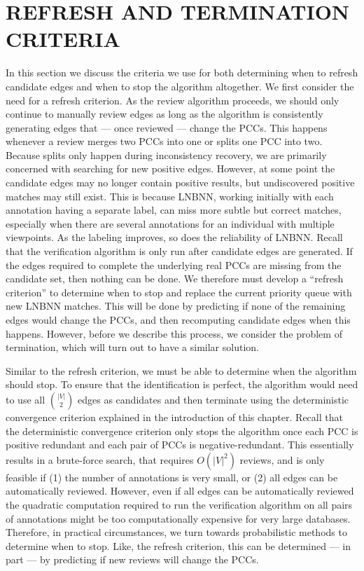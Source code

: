 \section{REFRESH AND TERMINATION CRITERIA}\label{sec:converge}


In this section we discuss the criteria we use for both determining when to refresh candidate edges and when to
  stop the algorithm altogether.
We first consider the need for a refresh criterion.
As the review algorithm proceeds, we should only continue to manually review edges as long as the algorithm is
  consistently generating edges that --- once reviewed --- change the PCCs.
This happens whenever a review merges two PCCs into one or splits one PCC into two.
Because splits only happen during inconsistency recovery, we are primarily concerned with searching for new
  positive edges.
However, at some point the candidate edges may no longer contain positive results, but undiscovered positive
  matches may still exist.
This is because LNBNN, working initially with each annotation having a separate label, can miss more subtle but
  correct matches, especially when there are several annotations for an individual with multiple viewpoints.
As the labeling improves, so does the reliability of LNBNN.
Recall that the verification algorithm is only run after candidate edges are generated.
If the edges required to complete the underlying real PCCs are missing from the candidate set, then nothing can
  be done.
We therefore must develop a ``refresh criterion'' to determine when to stop and replace the current priority
  queue with new LNBNN matches.
This will be done by predicting if none of the remaining edges would change the PCCs, and then recomputing
  candidate edges when this happens.
However, before we describe this process, we consider the problem of termination, which will turn out to have a
  similar solution.

Similar to the refresh criterion, we must be able to determine when the algorithm should stop.
To ensure that the identification is perfect, the algorithm would need to use all $\binom{|V|}{2}$ edges as
  candidates and then terminate using the deterministic convergence criterion explained in the introduction of this
  chapter.
Recall that the deterministic convergence criterion only stops the algorithm once each PCC is positive redundant
  and each pair of PCCs is negative-redundant.
This essentially results in a brute-force search, that requires $O(|V|^2)$ reviews, and is only feasible if
(1) the number of annotations is very small, or
(2) all edges can be automatically reviewed.
However, even if all edges can be automatically reviewed the quadratic computation required to run the
  verification algorithm on all pairs of annotations might be too computationally expensive for very large
  databases.
Therefore, in practical circumstances, we turn towards probabilistic methods to determine when to stop.
Like, the refresh criterion, this can be determined --- in part --- by predicting if new reviews will change the
  PCCs.

